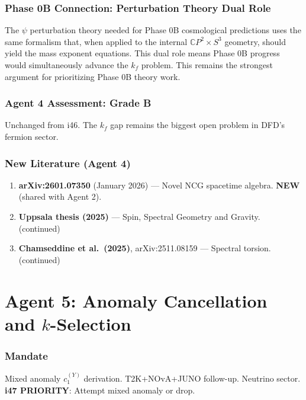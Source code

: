 \documentclass[11pt,a4paper]{article}
\newcommand{\NEW}{\textcolor{dfdblue}{\textbf{NEW}}}
\newcommand{\CP}{\mathbb{C}P}
\begin{document}
\section{Phase 0B Connection: Perturbation Theory Dual Role}

The $\psi$ perturbation theory needed for Phase 0B cosmological predictions uses the same formalism that, when applied to the internal $\CP^2 \times S^3$ geometry, should yield the mass exponent equations. This dual role means Phase 0B progress would simultaneously advance the $k_f$ problem. This remains the strongest argument for prioritizing Phase 0B theory work.

\section{Agent 4 Assessment: Grade B}

Unchanged from i46. The $k_f$ gap remains the biggest open problem in DFD's fermion sector.

\section{New Literature (Agent 4)}

\begin{enumerate}
\item \textbf{arXiv:2601.07350} (January 2026) --- Novel NCG spacetime algebra. \NEW{} (shared with Agent 2).
\item \textbf{Uppsala thesis (2025)} --- Spin, Spectral Geometry and Gravity. (continued)
\item \textbf{Chamseddine et al.\ (2025)}, arXiv:2511.08159 --- Spectral torsion. (continued)
\end{enumerate}


\part{Agent 5: Anomaly Cancellation and $k$-Selection}
\label{part:agent5}

\section{Mandate}

Mixed anomaly $c_1^{(Y)}$ derivation. T2K+NOvA+JUNO follow-up. Neutrino sector. \textbf{i47 PRIORITY}: Attempt mixed anomaly or drop.
\end{document}
